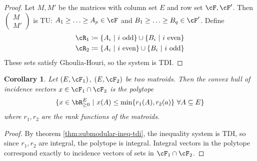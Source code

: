 \documentclass[11pt, a4paper]{article}
\newcommand{\set}[1]{\{#1\}}
\newtheorem{cor}[theorem]{Corollary}
\theoremstyle{remark}
\theoremstyle{definition}
\begin{document}
\begin{proof}
	Let $M,M'$ be the matrices with column set $E$ and row set
	$\cF,\cF'$. Then $\begin{pmatrix} M \\ M'\end{pmatrix}$ is TU: $A_1\geq \ldots\geq A_p
		\in\cF$ and $B_1\geq\ldots\geq B_q\in\cF'$. Define
	\begin{align*}
		\cR_1 & \coloneqq \set{A_i\ |\ i\text{ odd}}\cup \set{B_i\ |\ i\text{ even}} \\
		\cR_2 & \coloneqq \set{A_i\ |\ i\text{ even}}\cup\set{B_i\ |\ i\text{ odd}}
	\end{align*}
	These sets satisfy Ghoulia-Houri, so the system is TDI.
\end{proof}


\begin{cor}
	Let $(E,\cF_1)$, $(E,\cF_2)$ be two matroids. Then the convex hull of
	incidence vectors $x\in \cF_1\cap\cF_2$ is the polytope
	\[\set{x\in\bR^E_{\geq0}\ |\
		x(A)\leq\min\set{r_1(A),r_2(a)}\ \forall A\subseteq E}\]
	where $r_1,r_2$ are the rank functions of the matroids.
\end{cor}
\begin{proof}
	By theorem \ref{thm:submodular-ineq-tdi}, the inequality system is TDI,
	so since $r_1,r_2$ are integral, the polytope is integral. Integral
	vectors in the polytope correspond exactly to incidence vectors of
	sets in $\cF_1\cap\cF_2$.
\end{proof}
\end{document}
